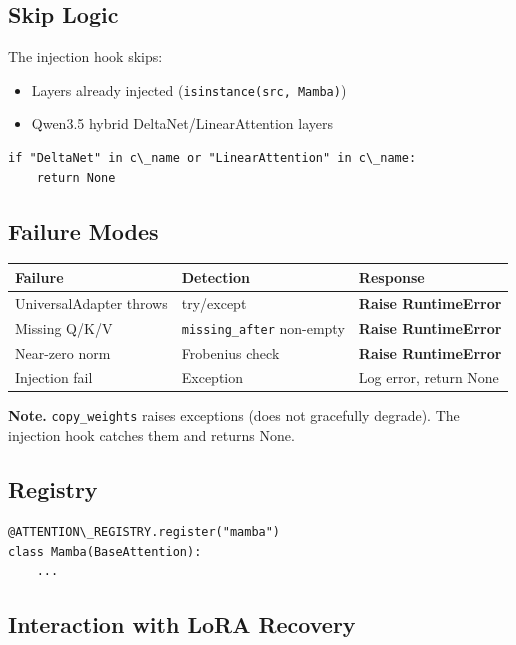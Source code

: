 \subsection{Skip Logic}

The injection hook skips:

\begin{itemize}
\item Layers already injected (\texttt{isinstance(src, Mamba)})
\item Qwen3.5 hybrid DeltaNet/LinearAttention layers

\end{itemize}
\begin{lstlisting}
if "DeltaNet" in c\_name or "LinearAttention" in c\_name:
    return None
\end{lstlisting}

\subsection{Failure Modes}

\begin{table}[H]
\centering
\small
\begin{tabular}{lll}
\toprule
\textbf{Failure} & \textbf{Detection} & \textbf{Response} \\
\midrule
UniversalAdapter throws & try/except & \textbf{Raise RuntimeError} \\
Missing Q/K/V & \texttt{missing\_after} non-empty & \textbf{Raise RuntimeError} \\
Near-zero norm & Frobenius check & \textbf{Raise RuntimeError} \\
Injection fail & Exception & Log error, return None \\
\bottomrule
\end{tabular}
\end{table}

\textbf{Note.} \texttt{copy\_weights} raises exceptions (does not gracefully degrade). 
The injection hook catches them and returns None.

\subsection{Registry}

\begin{lstlisting}
@ATTENTION\_REGISTRY.register("mamba")
class Mamba(BaseAttention):
    ...
\end{lstlisting}

\subsection{Interaction with LoRA Recovery}

